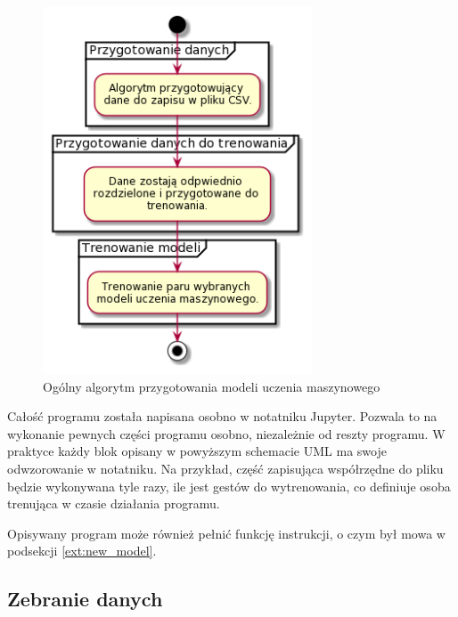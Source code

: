 \begin{figure}[H]
    \begin{center}
        \includegraphics[width=8cm]{../images/full_algorithm.png}
        \caption{Ogólny algorytm przygotowania modeli uczenia maszynowego}
        \label{img:full_algorithm}
    \end{center}
\end{figure}

\quad Całość programu została napisana osobno w notatniku Jupyter. Pozwala to na wykonanie pewnych części programu osobno, niezależnie od reszty programu. W praktyce każdy blok opisany w powyższym schemacie UML ma swoje odwzorowanie w notatniku. Na przykład, część zapisująca współrzędne do pliku będzie wykonywana tyle razy, ile jest gestów do wytrenowania, co definiuje osoba trenująca w czasie działania programu. 

\quad Opisywany program może również pełnić funkcję instrukcji, o czym był mowa w podsekcji \ref{ext:new_model}.

\subsection{Zebranie danych}

